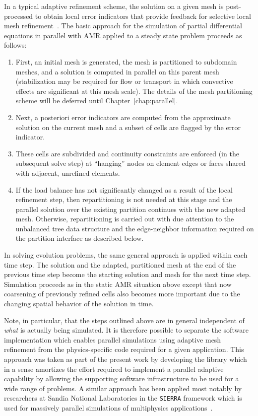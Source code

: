 In a typical adaptive refinement scheme, the solution on a given mesh
is post-processed to obtain local error indicators that provide
feedback for selective local mesh
refinement~\cite{carey_gridbook,carey_bail_2004}. The basic approach
for the simulation of partial differential equations in parallel with AMR applied to a steady state problem proceeds
as follows:
\begin{enumerate}
\item{First, an initial mesh is generated, the mesh is partitioned to
  subdomain meshes, and a solution is computed in parallel on this
  parent mesh (stabilization may be required for flow or transport in
  which convective effects are significant at this mesh scale).  The
  details of the mesh partitioning scheme will be deferred until
  Chapter~\ref{chap:parallel}.}
  
\item{Next, a posteriori error indicators are computed from the
 approximate solution on the current mesh and a subset of cells are
 flagged by the error indicator.}

\item{These cells are subdivided and continuity constraints are
  enforced (in the subsequent solve step) at ``hanging'' nodes on
  element edges or faces shared with adjacent, unrefined elements.}

\item{If the load balance has not significantly changed as a result of
  the local refinement step, then repartitioning is not needed at this
  stage and the parallel solution over the existing partition continues
  with the new adapted mesh. Otherwise, repartitioning is carried out
  with due attention to the unbalanced tree data structure and the
  edge-neighbor information required on the partition interface as
  described below.}
\end{enumerate}

In solving evolution problems, the same general approach is applied
within each time step.  The solution and the adapted, partitioned mesh
at the end of the previous time step become the starting solution and
mesh for the next time step.  Simulation proceeds as in the static AMR
situation above except that now coarsening of previously refined cells
also becomes more important due to the changing spatial behavior of the
solution in time.

Note, in particular, that the steps outlined above are in general independent of \emph{what} is actually being simulated.  It is therefore possible to separate the software implementation which enables parallel simulations using adaptive mesh refinement from the physics-specific code required for a given application.  This approach was taken as part of the present work by developing the \libMesh{} library which in a sense amortizes the effort required to implement a parallel adaptive capability by allowing the supporting software infrastructure to be used for a wide range of problems.  A similar approach has been applied most notably by researchers at Sandia National Laboratories in the \texttt{SIERRA} framework which is used for massively parallel simulations of multiphysics applications~\cite{sierra}.

